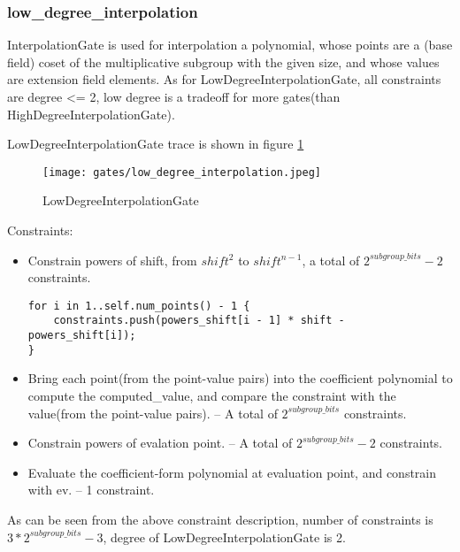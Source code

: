 \subsubsection{low\_degree\_interpolation}

InterpolationGate is used for interpolation a polynomial, whose points are a (base field) coset of the multiplicative subgroup 
with the given size, and whose values are extension field elements. As for LowDegreeInterpolationGate,  all constraints are degree <= 2, 
low degree is a tradeoff for more gates(than HighDegreeInterpolationGate).

LowDegreeInterpolationGate trace is shown in figure \ref{fig:low-degree-interpolation}

\begin{figure}[!ht]
    \centering
    \texttt{[image: gates/low\_degree\_interpolation.jpeg]}
    \caption{LowDegreeInterpolationGate}
    \label{fig:low-degree-interpolation}
\end{figure}

Constraints:
\begin{itemize}
    \item Constrain powers of shift, from $shift^2$ to $shift^{n-1}$, a total of $2^{subgroup\_bits}-2$ constraints.
    \begin{lstlisting}
for i in 1..self.num_points() - 1 {
    constraints.push(powers_shift[i - 1] * shift - powers_shift[i]);
}
    \end{lstlisting}
    \item Bring each point(from the point-value pairs) into the coefficient polynomial to compute the computed\_value, 
    and compare the constraint with the value(from the point-value pairs). -- A total of $2^{subgroup\_bits}$ constraints.
    \item Constrain powers of evalation point. -- A total of $2^{subgroup\_bits}-2$ constraints.
    \item Evaluate the coefficient-form polynomial at evaluation point, and constrain with ev. -- 1 constraint.
\end{itemize}

As can be seen from the above constraint description, number of constraints is $3*2^{subgroup\_bits}-3$, degree of LowDegreeInterpolationGate is 2.